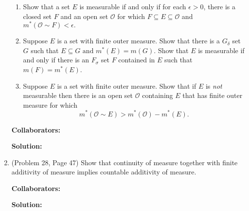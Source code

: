 \documentclass{article}%
\begin{document}
\begin{enumerate}
\begin{enumerate}
\item Show that a set $E$ is measurable if and only if for each $\epsilon > 0$, there is a closed set $F$ and an open set $\mathcal{O}$ for which $F\subseteq E \subseteq \mathcal{O}$ and $m^*(\mathcal{O} \sim F)< \epsilon.$
\item Suppose $E$ is a set with finite outer measure. Show that there is a $G_{\delta}$ set $G$ such that $
 E \subseteq G \text{ and } m^*(E) = m(G).$  Show that $E$ is measurable if and only if there is an $F_{\sigma}$ set $F$ contained in $E$ such that $m(F) = m^*(E)$.
\item Suppose $E$ is a set with finite outer measure. Show that if $E$ is \emph{not} measurable then there is an open set $\mathcal{O}$ containing $E$ that has finite outer measure for which \[
m^*(\mathcal{O}\sim E) > m^*(\mathcal{O}) - m^*(E).                                                                                                                                                                                                
                                                                                                                                                                                               \]

  
\end{enumerate}


\bigskip
\textbf{Collaborators:}\\
\smallskip
 
\textbf{Solution:}
\bigskip


\item (Problem 28, Page 47) Show that continuity of measure together  with finite additivity of measure implies countable additivity of measure.

\bigskip
\textbf{Collaborators:}\\
\smallskip
 
\textbf{Solution:}
\bigskip


\end{enumerate}
\end{document}
